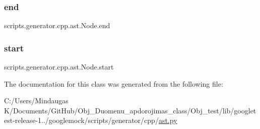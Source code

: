 \subsubsection{\texorpdfstring{end}{end}}
{\footnotesize\ttfamily scripts.\+generator.\+cpp.\+ast.\+Node.\+end}

\mbox{\label{classscripts_1_1generator_1_1cpp_1_1ast_1_1_node_a27ce0a583baee598b75ac6dd21f8575b}} 
\subsubsection{\texorpdfstring{start}{start}}
{\footnotesize\ttfamily scripts.\+generator.\+cpp.\+ast.\+Node.\+start}



The documentation for this class was generated from the following file\+:\begin{DoxyCompactItemize}
\item 
C\+:/\+Users/\+Mindaugas K/\+Documents/\+Git\+Hub/\+Obj\+\_\+\+Duomenu\+\_\+apdorojimas\+\_\+class/\+Obj\+\_\+test/lib/googletest-\/release-\/1../googlemock/scripts/generator/cpp/\mbox{\hyperlink{_obj__test_2lib_2googletest-release-1_88_81_2googlemock_2scripts_2generator_2cpp_2ast_8py}{ast.\+py}}\end{DoxyCompactItemize}
